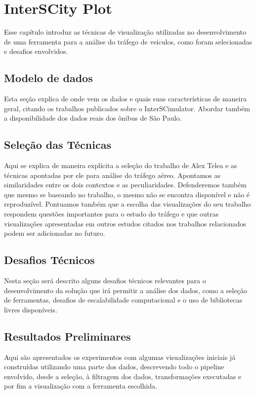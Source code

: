 \chapter{InterSCity Plot}
\label{cap:visualizacao}

Esse capítulo introduz as técnicas de visualização utilizadas no desenvolvimento
de uma ferramenta para a análise do tráfego de veículos, como foram selecionadas e desafios envolvidos.

\section{Modelo de dados}

Esta seção explica de onde vem os dados e quais suas características de maneira geral,
citando os trabalhos publicados sobre o InterSCimulator. Abordar também a disponibilidade
dos dados reais dos ônibus de São Paulo.

\section{Seleção das Técnicas}

Aqui se explica de maneira explícita a seleção do trabalho de Alex Telea e as técnicas
apontadas por ele para análise do tráfego aéreo. Apontamos as similaridades entre
os dois contextos e as peculiaridades. Defenderemos também que mesmo se baseando
no trabalho, o mesmo não se encontra disponível e não é reproduzível. Pontuamos também
que a escolha das visualizações do seu trabalho respondem questões importantes
para o estudo do tráfego e que outras visualizações apresentadas em outros estudos citados
nos trabalhos relacionados podem ser adicionadas no futuro.

\section{Desafios Técnicos}

Nesta seção será descrito alguns desafios técnicos relevantes para o desenvolvimento da solução
que irá permitir a análise dos dados, como a seleção de ferramentas,
desafios de escalabilidade computacional e o uso de bibliotecas livres disponíveis.

\section{Resultados Preliminares}

Aqui são apresentados os experimentos com algumas visualizações iniciais já construídas
utilizando uma parte dos dados, descrevendo todo o pipeline envolvido, desde a seleção, à filtragem dos dados,
transformações executadas e por fim a visualização com a ferramenta escolhida.
